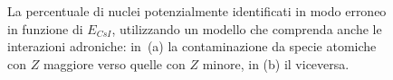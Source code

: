 \begin{figure}[!p] 
	\centering
	\hspace{10mm}
	\caption{La percentuale di nuclei potenzialmente identificati in modo erroneo in funzione di $E_{CsI}$, utilizzando un modello che comprenda anche le interazioni adroniche: in~(a) la contaminazione da specie atomiche con $Z$ maggiore verso quelle con $Z$ minore, in (b) il viceversa.} \label{fig:leakage_res_adron}
\end{figure}



\subsection{}

